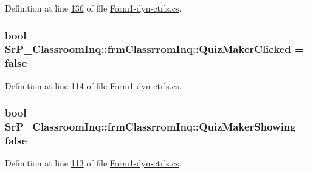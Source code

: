 \-Definition at line \hyperlink{_form1-dyn-ctrls_8cs_source_l00136}{136} of file \hyperlink{_form1-dyn-ctrls_8cs_source}{\-Form1-\/dyn-\/ctrls.\-cs}.

\hypertarget{class_sr_p___classroom_inq_1_1frm_classrrom_inq_a80b43512315939f073e08cfea00ce796}{
\subsubsection[{\-Quiz\-Maker\-Clicked}]{\setlength{\rightskip}{0pt plus 5cm}bool {\bf \-Sr\-P\-\_\-\-Classroom\-Inq\-::frm\-Classrrom\-Inq\-::\-Quiz\-Maker\-Clicked} = false}}
\label{class_sr_p___classroom_inq_1_1frm_classrrom_inq_a80b43512315939f073e08cfea00ce796}


\-Definition at line \hyperlink{_form1-dyn-ctrls_8cs_source_l00114}{114} of file \hyperlink{_form1-dyn-ctrls_8cs_source}{\-Form1-\/dyn-\/ctrls.\-cs}.

\hypertarget{class_sr_p___classroom_inq_1_1frm_classrrom_inq_a527e6e32ab67073ccbdb94297399ab2d}{
\subsubsection[{\-Quiz\-Maker\-Showing}]{\setlength{\rightskip}{0pt plus 5cm}bool {\bf \-Sr\-P\-\_\-\-Classroom\-Inq\-::frm\-Classrrom\-Inq\-::\-Quiz\-Maker\-Showing} = false}}
\label{class_sr_p___classroom_inq_1_1frm_classrrom_inq_a527e6e32ab67073ccbdb94297399ab2d}


\-Definition at line \hyperlink{_form1-dyn-ctrls_8cs_source_l00113}{113} of file \hyperlink{_form1-dyn-ctrls_8cs_source}{\-Form1-\/dyn-\/ctrls.\-cs}.

